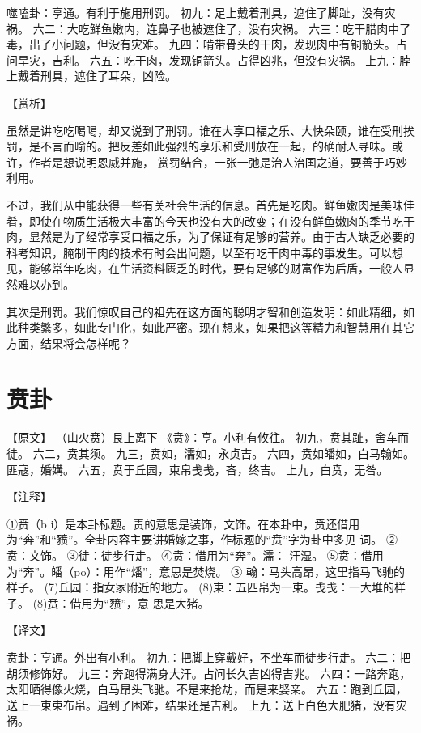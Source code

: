\documentclass[12pt,UTF8]{ctexbook}
\begin{document}
噬嗑卦：亨通。有利于施用刑罚。
初九：足上戴着刑具，遮住了脚趾，没有灾祸。
六二：大吃鲜鱼嫩内，连鼻子也被遮住了，没有灾祸。
六三：吃干腊肉中了毒，出了小问题，但没有灾难。
九四：啃带骨头的干肉，发现肉中有铜箭头。占问旱灾，吉利。
六五：吃干肉，发现铜箭头。占得凶兆，但没有灾祸。
上九：脖上戴着刑具，遮住了耳朵，凶险。

【赏析】

虽然是讲吃吃喝喝，却又说到了刑罚。谁在大享口福之乐、大快朵颐，谁在受刑挨罚，是不言而喻的。把反差如此强烈的享乐和受刑放在一起，的确耐人寻味。或许，作者是想说明恩威并施， 赏罚结合，一张一弛是治人治国之道，要善于巧妙利用。

不过，我们从中能获得一些有关社会生活的信息。首先是吃肉。鲜鱼嫩肉是美味佳肴，即使在物质生活极大丰富的今天也没有大的改变；在没有鲜鱼嫩肉的季节吃干肉，显然是为了经常享受口福之乐，为了保证有足够的营养。由于古人缺乏必要的科考知识，腌制干肉的技术有时会出问题，以至有吃干肉中毒的事发生。可以想见，能够常年吃肉，在生活资料匮乏的时代，要有足够的财富作为后盾，一般人显然难以办到。

其次是刑罚。我们惊叹自己的祖先在这方面的聪明才智和创造发明：如此精细，如此种类繁多，如此专门化，如此严密。现在想来，如果把这等精力和智慧用在其它方面，结果将会怎样呢？

\chapter{贲卦}

【原文】
（山火贲）艮上离下
《贲》：亨。小利有攸往。
初九，贲其趾，舍车而徒。
六二，贲其须。
九三，贲如，濡如，永贞吉。
六四，贲如皤如，白马翰如。匪寇，婚媾。
六五，贲于丘园，束帛戋戋，吝，终吉。
上九，白贲，无咎。

【注释】

①贲（b i）是本卦标题。责的意思是装饰，文饰。在本卦中，贲还借用为“奔”和“豮”。全卦内容主要讲婚嫁之事，作标题的“贲”字为卦中多见 词。
②贲：文饰。
③徒：徒步行走。
④贲：借用为“奔”。濡： 汗湿。
⑤贲：借用为“奔”。皤（po）：用作“燔”，意思是焚烧。
③ 翰：马头高昂，这里指马飞驰的样子。
(7)丘园：指女家附近的地方。
(8)束：五匹帛为一束。戋戋：一大堆的样子。
(8)贲：借用为“豮”，意 思是大猪。

【译文】

贲卦：亨通。外出有小利。
初九：把脚上穿戴好，不坐车而徒步行走。
六二：把胡须修饰好。
九三：奔跑得满身大汗。占问长久吉凶得吉兆。
六四：一路奔跑，太阳晒得像火烧，白马昂头飞驰。不是来抢劫，而是来娶亲。
六五：跑到丘园，送上一束束布帛。遇到了困难，结果还是吉利。
上九：送上白色大肥猪，没有灾祸。
\end{document}
